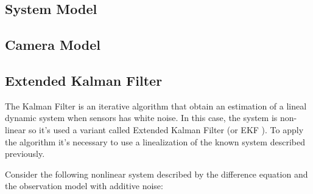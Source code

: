 \subsection{System Model}

\subsection{Camera Model}

\subsection{Extended Kalman Filter}

The Kalman Filter is an iterative algorithm that obtain an estimation of a lineal dynamic system when sensors has white noise. In this case, the system is non-linear so it's used a variant called Extended Kalman Filter \cite{GabrielTerejanu} (or EKF ). To apply the algorithm it's necessary to use a linealization of the known system described previously.

Consider the following nonlinear system described by the difference equation and the observation model with additive noise: \\




